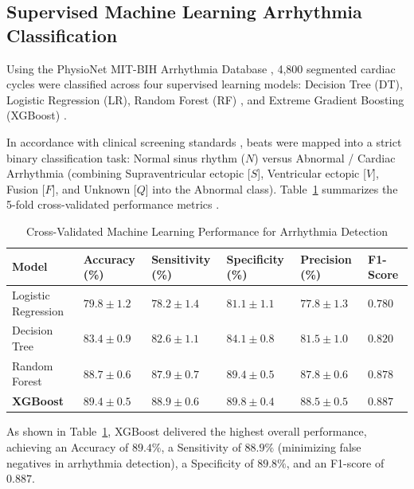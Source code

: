 \subsection{Supervised Machine Learning Arrhythmia Classification}
Using the PhysioNet MIT-BIH Arrhythmia Database \cite{goldberger2000physiobank}, 4,800 segmented cardiac cycles were classified across four supervised learning models: Decision Tree (DT), Logistic Regression (LR), Random Forest (RF) \cite{breiman2001random}, and Extreme Gradient Boosting (XGBoost) \cite{chen2016xgboost}. 

In accordance with clinical screening standards \cite{pandian2026internet}, beats were mapped into a strict binary classification task: Normal sinus rhythm ($N$) versus Abnormal / Cardiac Arrhythmia (combining Supraventricular ectopic [$S$], Ventricular ectopic [$V$], Fusion [$F$], and Unknown [$Q$] into the Abnormal class). Table~\ref{tab:ml_classification_results} summarizes the 5-fold cross-validated performance metrics \cite{sokolova2009systematic}.

\begin{table}[!htbp]
\footnotesize
\centering
\caption{Cross-Validated Machine Learning Performance for Arrhythmia Detection}
\label{tab:ml_classification_results}
\begin{tabular}{|p{2.6cm}|p{1.9cm}|p{1.9cm}|p{1.9cm}|p{1.9cm}|p{1.9cm}|}
\hline
\textbf{Model} & \textbf{Accuracy (\%)} & \textbf{Sensitivity (\%)} & \textbf{Specificity (\%)} & \textbf{Precision (\%)} & \textbf{F1-Score} \\ \hline
Logistic Regression & $79.8 \pm 1.2$ & $78.2 \pm 1.4$ & $81.1 \pm 1.1$ & $77.8 \pm 1.3$ & $0.780$ \\ \hline
Decision Tree & $83.4 \pm 0.9$ & $82.6 \pm 1.1$ & $84.1 \pm 0.8$ & $81.5 \pm 1.0$ & $0.820$ \\ \hline
Random Forest & $88.7 \pm 0.6$ & $87.9 \pm 0.7$ & $89.4 \pm 0.5$ & $87.8 \pm 0.6$ & $0.878$ \\ \hline
\textbf{XGBoost} & $\mathbf{89.4 \pm 0.5}$ & $\mathbf{88.9 \pm 0.6}$ & $\mathbf{89.8 \pm 0.4}$ & $\mathbf{88.5 \pm 0.5}$ & $\mathbf{0.887}$ \\ \hline
\end{tabular}
\end{table}

As shown in Table~\ref{tab:ml_classification_results}, XGBoost delivered the highest overall performance, achieving an Accuracy of $89.4\%$, a Sensitivity of $88.9\%$ (minimizing false negatives in arrhythmia detection), a Specificity of $89.8\%$, and an F1-score of $0.887$. 

